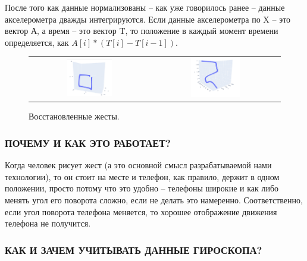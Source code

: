 После того как данные нормализованы – как уже говорилось ранее – данные акселерометра дважды интегрируются. Если данные акселерометра по X – это вектор А, а время – это вектор T, то положение в каждый момент времени определяется, как $A[i] * (T[i] - T[i-1])$.

\begin{figure}[H]
    \begin{center}
        \begin{tabular}{cc}
            \includegraphics[width=0.4\textwidth]{sam_images/3d_graph_1.png} & 
            \includegraphics[width=0.4\textwidth]{sam_images/3d_graph_2.png} \\
        \end{tabular}
    \end{center}
    \caption{Восстановленные жесты.}
\end{figure}

\subsubsection{ПОЧЕМУ И КАК ЭТО РАБОТАЕТ?}

Когда человек рисует жест (а это основной смысл разрабатываемой нами технологии), то он стоит на месте и телефон, как правило, держит в одном положении, просто потому что это удобно – телефоны широкие и как либо менять угол его поворота сложно, если не делать это намеренно. Соответственно, если угол поворота телефона меняется, то хорошее отображение движения телефона не получится.
\newpage

\subsubsection{КАК И ЗАЧЕМ УЧИТЫВАТЬ ДАННЫЕ ГИРОСКОПА?}

